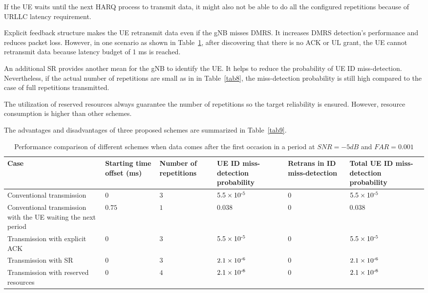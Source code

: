 \documentclass{ieeeaccess}
\begin{document}
If the UE waits until the next HARQ process to transmit data, it might also not be able to do all the configured repetitions because of URLLC latency requirement.

Explicit feedback structure makes the UE retransmit data even if the gNB misses DMRS. It increases DMRS detection's performance and reduces packet loss. However, in one scenario as shown in Table~\ref{tab6}, after discovering that there is no ACK or UL grant, the UE cannot retransmit data because latency budget of 1 ms is reached.

An additional SR provides another mean for the gNB to identify the UE. It helps to reduce the probability of UE ID miss-detection. Nevertheless, if the actual number of repetitions are small as in in Table~\ref{tab8}, the miss-detection probability is still high compared to the case of full repetitions transmitted.

The utilization of reserved resources always guarantee the number of repetitions so the target reliability is ensured. However, resource consumption is higher than other schemes.

The advantages and disadvantages of three proposed schemes are summarized in Table~\ref{tab9}.

\begin{table}[htbp]
\caption{Performance comparison of different schemes when data comes after the first occasion in a period at $SNR = -5dB$ and $FAR = 0.001$}
\begin{center}
\begin{tabular}{|p{6em}|p{3em}|p{3em}|p{3.2em}|p{3.2em}|p{3.2em}|}
 \hline
 \textbf{Case} & \textbf{Starting time offset (ms)}&\textbf{Number of repetitions}&\textbf{UE ID miss-detection probability}&\textbf{Retrans in ID miss-detection}&\textbf{Total UE ID miss-detection probability}\\
 \hline
 Conventional transmission&$0$&$3$&$5.5\times10\textsuperscript{-5}$&$0$&$5.5\times10\textsuperscript{-5}$\\
 \hline
 Conventional transmission with the UE waiting the next period&$0.75$&$1$&$0.038$&$0$&$0.038$\\
 \hline
Transmission with explicit ACK&$0$&$3$&$5.5\times10\textsuperscript{-5}$&$0$&$5.5\times10\textsuperscript{-5}$\\
\hline
Transmission with SR&$0$&$3$&$2.1\times10\textsuperscript{-6}$&$0$&$2.1\times10\textsuperscript{-6}$\\
 \hline
Transmission with reserved resources&$0$&$4$&$2.1\times10\textsuperscript{-6}$&$0$&$2.1\times10\textsuperscript{-6}$\\
 \hline
\end{tabular}
\label{tab6}
\end{center}

\end{table}
\end{document}
